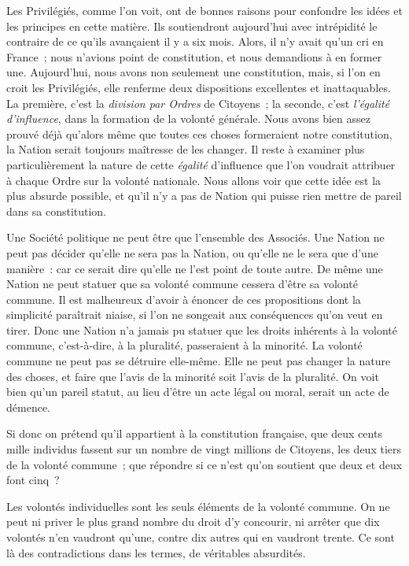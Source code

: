 \documentclass[french,twoside]{book} %
\begin{document}
Les Privilégiés, comme l’on voit, ont de bonnes raisons pour confondre les idées et les principes en cette matière. Ils soutiendront aujourd’hui avec intrépidité le contraire de ce qu’ils avançaient il y a six mois. Alors, il n’y avait qu’un cri en France ; nous n’avions point de constitution, et nous demandions à en former une. Aujourd’hui, nous avons non seulement une constitution, mais, si l’on en croit les Privilégiés, elle renferme deux dispositions excellentes et inattaquables. La première, c’est la {\itshape division par Ordres} de Citoyens ; la seconde, c’est {\itshape l’égalité d’influence}, dans la formation de la volonté générale. Nous avons bien assez prouvé déjà qu’alors même que toutes ces choses formeraient notre constitution, la Nation serait toujours maîtresse de les changer. Il reste à examiner plus particulièrement la nature de cette {\itshape égalité} d’influence que l’on voudrait attribuer à chaque Ordre sur la volonté nationale. Nous allons voir que cette idée est la plus absurde possible, et qu’il n’y a pas de Nation qui puisse rien mettre de pareil dans sa constitution.\par
Une Société politique ne peut être que l’ensemble des Associés. Une Nation ne peut pas décider qu’elle ne sera pas la Nation, ou qu’elle ne le sera que d’une manière : car ce serait dire qu’elle ne l’est point de toute autre. De même une Nation ne peut statuer que sa volonté commune cessera d’être sa volonté commune. Il est malheureux d’avoir à énoncer de ces propositions dont la simplicité paraîtrait niaise, si l’on ne songeait aux conséquences qu’on veut en tirer. Donc une Nation n’a jamais pu statuer que les droits inhérents à la volonté commune, c’est-à-dire, à la pluralité, passeraient à la minorité. La volonté commune ne peut pas se détruire elle-même. Elle ne peut pas changer la nature des choses, et faire que l’avis de la minorité soit l’avis de la pluralité. On voit bien qu’un pareil statut, au lieu d’être un acte légal ou moral, serait un acte de démence.\par
Si donc on prétend qu’il appartient à la constitution française, que deux cents mille individus fassent sur un nombre de vingt millions de Citoyens, les deux tiers de la volonté commune ; que répondre si ce n’est qu’on soutient que deux et deux font cinq ?\par
Les volontés individuelles sont les seuls éléments de la volonté commune. On ne peut ni priver le plus grand nombre du droit d’y concourir, ni arrêter que dix volontés n’en vaudront qu’une, contre dix autres qui en vaudront trente. Ce sont là des contradictions dans les termes, de véritables absurdités.\par
\end{document}
